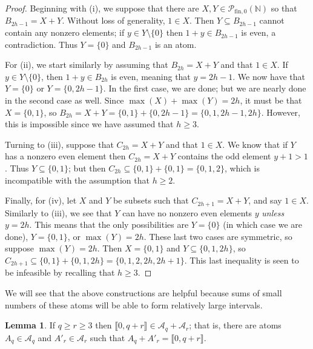 \documentclass{report}
\newcommand{\A}{\mathscr{A}}
\newcommand{\NN}{\mathbb{N}}
\renewcommand{\P}{\mathcal{P}}
\newcommand{\llb}{\llbracket}
\newcommand{\rrb}{\rrbracket}
\newcommand{\fin}{\textrm{fin}}
\renewcommand{\:}{\text{:}}
\newcommand{\PN}{{\P_{\fin,0}(\NN)}}
\theoremstyle{definition}
\newtheorem{lemma}[defn]{Lemma}
\begin{document}
\begin{proof}
Beginning with (i), we suppose that there are $X,Y\in \PN$ so that $B_{2h-1} = X + Y$.
Without loss of generality, $1\in X$.
Then $Y\subseteq B_{2h-1}$ cannot contain any nonzero elements; if $y\in Y\setminus\{0\}$ then $1+y\in B_{2h-1}$ is even, a contradiction.
Thus $Y = \{0\}$ and $B_{2h-1}$ is an atom.

For (ii), we start similarly by assuming that $B_{2h} = X + Y$ and that $1\in X$.
If $y\in Y \setminus\{0\}$, then $1+y\in B_{2h}$ is even, meaning that $y = 2h-1$.
We now have that $Y = \{0\}$ or $Y = \{0,2h-1\}$.
In the first case, we are done; but we are nearly done in the second case as well.  
Since $\max(X) + \max(Y) = 2h$, it must be that $X = \{0,1\}$, so $B_{2h} = X+Y = \{0,1\} + \{0,2h-1\} = \{0,1,2h-1,2h\}$.
However, this is impossible since we have assumed that $h\ge 3$.

Turning to (iii), suppose that $C_{2h} = X + Y$ and that $1\in X$.
We know that if $Y$ has a nonzero even element then $C_{2h} = X + Y$ contains the odd element $y+1 > 1$.
Thus $Y \subseteq \{0,1\}$; but then $C_{2h} \subseteq \{0,1\} + \{0,1\} = \{0,1,2\}$, which is incompatible with the assumption that $h\ge 2$.

Finally, for (iv), let $X$ and $Y$ be subsets such that $C_{2h+1} = X + Y$, and say $1\in X$.
Similarly to (iii), we see that $Y$ can have no nonzero even elements $y$ \textit{unless} $y=2h$.
This means that the only possibilities are $Y = \{0\}$ (in which case we are done), $Y = \{0,1\}$, or $\max(Y) = 2h$.
These last two cases are symmetric, so suppose $\max(Y) = 2h$.
Then $X = \{0,1\}$ and $Y \subseteq \{0,1,2h\}$, so $C_{2h+1} \subseteq \{0,1\} + \{0,1,2h\} = \{0,1,2,2h,2h+1\}$.
This last inequality is seen to be infeasible by recalling that $h\ge 3$.
\end{proof}

We will see that the above constructions are helpful because sums of small numbers of these atoms will be able to form relatively large intervals.

\begin{lemma} \label{lem:two-part types}
If $q\ge r \ge 3$ then $\llb 0, q+r \rrb \in \A_q + \A_r$; that is, there are atoms $A_q\in \A_q$ and $A'_r\in \A_r$ such that $A_q + A'_r = \llb 0,q+r \rrb$.
\end{lemma}
\end{document}
